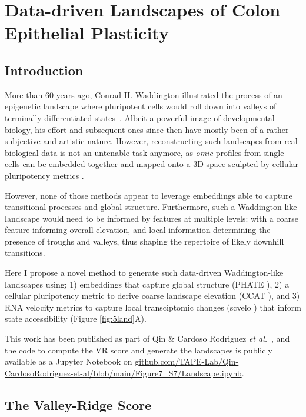 \chapter{Data-driven Landscapes of Colon Epithelial Plasticity}
\label{05vr}

\newpage
\section{Introduction}

More than 60 years ago, Conrad H. Waddington illustrated the process of an epigenetic landscape where pluripotent cells would roll down into valleys of terminally differentiated states~\cite{ch_waddington_waddington_1957}. Albeit a powerful image of developmental biology, his effort and subsequent ones since then have mostly been of a rather subjective and artistic nature. However, reconstructing such landscapes from real biological data is not an untenable task anymore, as \emph{omic} profiles from single-cells can be embedded together and mapped onto a 3D space sculpted by cellular pluripotency metrics \cite{chen_single-cell_2019}.

However, none of those methods appear to leverage embeddings able to capture transitional processes and global structure. Furthermore, such a Waddington-like landscape would need to be informed by features at multiple levels: with a coarse feature informing overall elevation, and local information determining the presence of troughs and valleys, thus shaping the repertoire of likely downhill transitions.

Here I propose a novel method to generate such data-driven Waddington-like landscapes using; 1) embeddings that capture global structure (PHATE \cite{moon_visualizing_2019}), 2) a cellular pluripotency metric to derive coarse landscape elevation (CCAT \cite{teschendorff_single-cell_2017}), and 3) RNA velocity metrics to capture local transciptomic changes (scvelo \cite{bergen_generalizing_2020}) that inform state accessibility (Figure \ref{fig:5land}A).

This work has been published as part of Qin \& Cardoso Rodriguez \emph{et al.}~\cite{cardoso_rodriguez_single-cell_2023}, and the code to compute the VR score and generate the landscapes is publicly available as a Jupyter Notebook on \url{github.com/TAPE-Lab/Qin-CardosoRodriguez-et-al/blob/main/Figure7_S7/Landscape.ipynb}. 

\newpage
\section{The Valley-Ridge Score}

